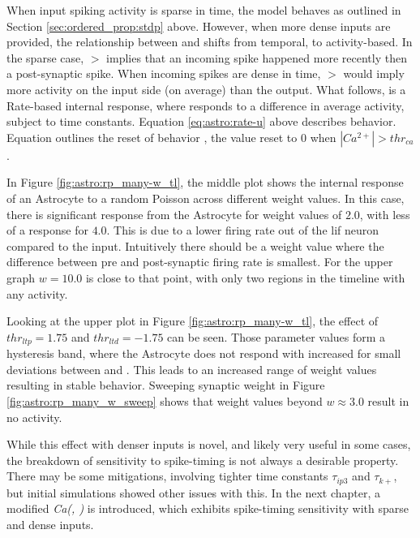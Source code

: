 When input spiking activity is sparse in time, the model behaves as outlined
in Section \ref{sec:ordered_prop:stdp} above. However, when more dense
inputs are provided, the relationship between \ipt and \kp shifts from
temporal, to activity-based. In the sparse case, \ipt $>$ \kp implies that an
incoming spike happened more recently then a post-synaptic spike. When
incoming spikes are dense in time, \ipt $>$ \kp would imply more activity on
the input side (on average) than the output. What follows, is a Rate-based
internal response, where \ca responds to a difference in average activity,
subject to time constants. Equation \ref{eq:astro:rate-u} above describes \ca
behavior. Equation \label{eq:astro:u-reset} outlines the reset of behavior \ca,
the value reset to $0$ when $|Ca^{2+}| > thr_{ca}$.

In Figure \ref{fig:astro:rp_many-w_tl}, the middle plot shows the internal
response of an Astrocyte to a random Poisson across different weight values. In
this case, there is significant response from the Astrocyte for weight values of
$2.0$, with less of a response for $4.0$. This is due to a lower firing rate out
of the \Gls{lif} neuron compared to the input. Intuitively there should be a weight
value where the difference between pre and post-synaptic firing rate is
smallest. For the upper graph $w=10.0$ is close to that point, with only two
regions in the timeline with any activity.


Looking at the upper plot in Figure \ref{fig:astro:rp_many-w_tl}, the effect of
$thr_{ltp}=1.75$ and $thr_{ltd}=-1.75$ can be seen. Those parameter values form
a hysteresis band, where the Astrocyte does not respond with increased \ca for
small deviations between \ipt and \kp. This leads to an increased range of
weight values resulting in stable behavior. Sweeping synaptic weight in Figure
\ref{fig:astro:rp_many_w_sweep} shows that weight values beyond $w \approx 3.0$
result in no \ca activity.


While this effect with denser inputs is novel, and likely very useful in some
cases, the breakdown of sensitivity to spike-timing is not always a desirable
property. There may be some mitigations, involving tighter time constants
$\tau_{ip3}$ and $\tau_{k+}$, but initial simulations showed other issues with
this. In the next chapter, a modified \emph{Ca(\ipt, \kp)} is introduced, which
exhibits spike-timing sensitivity with sparse and dense inputs.

